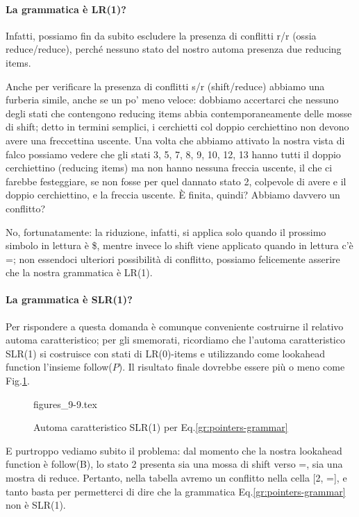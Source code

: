 \documentclass[class=book, crop=false, oneside, 12pt]{standalone}
\begin{document}
\paragraph{La grammatica è LR(1)?}
Infatti, possiamo fin da subito escludere la presenza di conflitti r/r (ossia reduce/reduce), perché nessuno stato del nostro automa presenza due reducing items.

Anche per verificare la presenza di conflitti s/r (shift/reduce) abbiamo una furberia simile, anche se un po' meno veloce: dobbiamo accertarci che nessuno degli stati che contengono reducing items abbia contemporaneamente delle mosse di shift; detto in termini semplici, i cerchietti col doppio cerchiettino non devono avere una freccettina uscente. Una volta che abbiamo attivato la nostra vista di falco possiamo vedere che gli stati 3, 5, 7, 8, 9, 10, 12, 13 hanno tutti il doppio cerchiettino (reducing items) ma non hanno nessuna freccia uscente, il che ci farebbe festeggiare, se non fosse per quel dannato stato 2, colpevole di avere e il doppio cerchiettino, e la freccia uscente. È finita, quindi? Abbiamo davvero un conflitto? 

No, fortunatamente: la riduzione, infatti, si applica solo quando il prossimo simbolo in lettura è \$, mentre invece lo shift viene applicato quando in lettura c'è =; non essendoci ulteriori possibilità di conflitto, possiamo felicemente asserire che la nostra grammatica è LR(1).

\paragraph{La grammatica è SLR(1)?}
Per rispondere a questa domanda è comunque conveniente costruirne il relativo automa caratteristico; per gli smemorati, ricordiamo che l'automa caratteristico SLR(1) si costruisce con stati di LR(0)-items e utilizzando come lookahead function l'insieme follow(\(P\)). Il risultato finale dovrebbe essere più o meno come Fig.\ref{fig:pointers-automaton-slr1}.
\begin{figure}[H]
    \centering
	{figures_9-9.tex}
    \caption{Automa caratteristico SLR(1) per Eq.\ref{gr:pointers-grammar}}
    \label{fig:pointers-automaton-slr1}
\end{figure}
E purtroppo vediamo subito il problema: dal momento che la nostra lookahead function è follow(B), lo stato 2 presenta sia una mossa di shift verso =, sia una mostra di reduce. Pertanto, nella tabella avremo un conflitto nella cella [2, =], e tanto basta per permetterci di dire che la grammatica Eq.\ref{gr:pointers-grammar} non è SLR(1).
\end{document}
